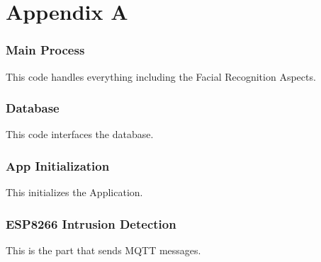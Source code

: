 \chapter*{Appendix A}
\subsection*{Main Process}
    \begin{flushleft}
        This code handles everything including the Facial Recognition Aspects.
    \end{flushleft}

    

\subsection*{Database}
    \begin{flushleft}
        This code interfaces the database.
    \end{flushleft}
    
    

\subsection*{App Initialization}
    \begin{flushleft}
        This initializes the Application.
    \end{flushleft}
    

\subsection*{ESP8266 Intrusion Detection}
    \begin{flushleft}
        This is the part that sends MQTT messages.
    \end{flushleft}
    